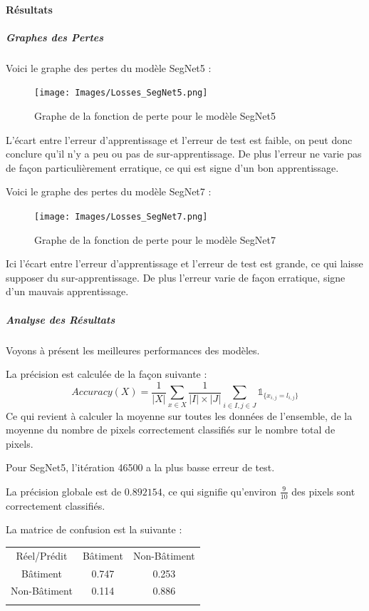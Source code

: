 \documentclass[a4paper, 11pt]{report}
\begin{document}
\paragraph{Résultats}
\subparagraph{Graphes des Pertes}
Voici le graphe des pertes du modèle SegNet5 :
\begin{figure}[H]
	\begin{center}
		\texttt{[image: Images/Losses\_SegNet5.png]}
		\caption{Graphe de la fonction de perte pour le modèle SegNet5}
	\end{center}
\end{figure}
L'écart entre l'erreur d'apprentissage et l'erreur de test est faible, on peut donc conclure qu'il n'y a peu ou pas de sur-apprentissage.
De plus l'erreur ne varie pas de façon particulièrement erratique, ce qui est signe d'un bon apprentissage.

Voici le graphe des pertes du modèle SegNet7 :
\begin{figure}[H]
	\begin{center}
		\texttt{[image: Images/Losses\_SegNet7.png]}
		\caption{Graphe de la fonction de perte pour le modèle SegNet7}
	\end{center}
\end{figure}
Ici l'écart entre l'erreur d'apprentissage et l'erreur de test est grande, ce qui laisse supposer du sur-apprentissage.
De plus l'erreur varie de façon erratique, signe d'un mauvais apprentissage.
\subparagraph{Analyse des Résultats}
Voyons à présent les meilleures performances des modèles.

La précision est calculée de la façon suivante :
$$Accuracy(X) = \frac{1}{|X|}\sum_{x \in X} {\frac{1}{|I| \times |J|}\sum_{i \in I, j \in J} {\mathds{1}_{\{x_{i, j} = l_{i, j}\}}}}$$
Ce qui revient à calculer la moyenne sur toutes les données de l'ensemble, de la moyenne du nombre de pixels correctement classifiés sur le nombre total de pixels.

Pour SegNet5, l'itération 46500 a la plus basse erreur de test.

La précision globale est de $0.892154$, ce qui signifie qu'environ $\frac{9}{10}$ des pixels sont correctement classifiés.

La matrice de confusion est la suivante :
\begin{center}
\begin{tabularx}{0.5\textwidth}{c|c c|}
	Réel/Prédit & Bâtiment & \multicolumn{1}{c}{Non-Bâtiment} \\
	\hhline{---}
	Bâtiment & 0.747 \cellcolor[gray]{.8} & 0.253 \\
	Non-Bâtiment & 0.114 & 0.886 \cellcolor[gray]{.8}\\
	\hhline{~--}
\end{tabularx}
\end{center}
\end{document}
